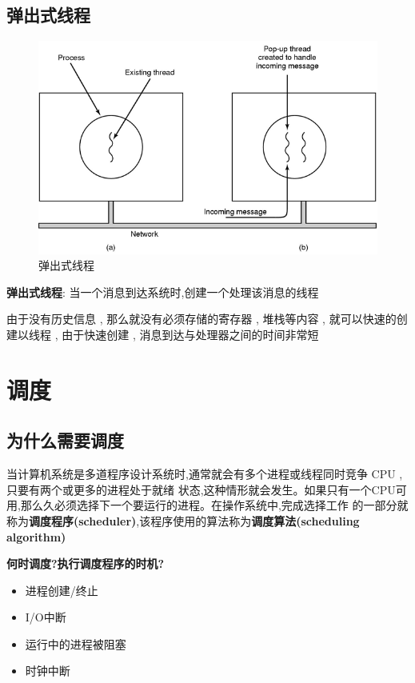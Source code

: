 \documentclass[UTF8,a4paper]{ctexart}
\newcommand{\spaceline}{\vspace{\baselineskip}}
\begin{document}
\subsection{弹出式线程}
\begin{figure}[H]
	\centering
	\includegraphics[scale = 0.3]{assets/ModernOperatingSystems_6789a.png}
	\caption{弹出式线程}
\end{figure}
\textbf{弹出式线程}: 当一个消息到达系统时,创建一个处理该消息的线程

由于没有历史信息 , 那么就没有必须存储的寄存器 , 堆栈等内容 , 就可以快速的创建以线程 , 由于快速创建 , 消息到达与处理器之间的时间非常短


\section{调度}

\subsection{为什么需要调度}
当计算机系统是多道程序设计系统时,通常就会有多个进程或线程同时竞争 CPU ,只要有两个或更多的进程处于就绪
状态,这种情形就会发生。如果只有一个CPU可用,那么久必须选择下一个要运行的进程。在操作系统中,完成选择工作
的一部分就称为\textbf{调度程序(scheduler)},该程序使用的算法称为\textbf{调度算法(scheduling algorithm)}

\spaceline
\textbf{何时调度?执行调度程序的时机?}
\begin{itemize}
	\item 进程创建/终止
	\item I/O中断
	\item 运行中的进程被阻塞
	\item 时钟中断
\end{itemize}
\end{document}
